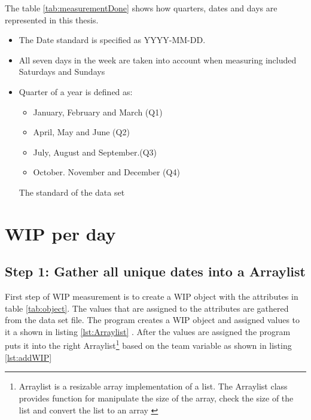 \documentclass[UKenglish]{ifimaster}  %
\begin{document}
The table \ref{tab:measurementDone} shows how quarters, dates and days are represented in this thesis. 

\begin{table}[!ht]
\centering
\begin{itemize}
\item The Date standard is specified as YYYY-MM-DD.
\item All seven days in the week are taken into account when measuring included Saturdays and Sundays
\item Quarter of a year is defined as: 
\begin{itemize}
\item January, February and March (Q1)
\item April, May and June (Q2)
\item July, August and September.(Q3)
\item October. November and December (Q4)
\end{itemize}
\parencite{Quarter}
\caption{The standard of the data set}
\label{tab:measurementDone}
\end{itemize}
\end{table}






\section {WIP per day}
\label{WPD}


\subsection{Step 1: Gather all unique dates into a Arraylist}
\label{sub:stepOne}
First step of WIP measurement is to create a WIP object with the attributes in table \ref{tab:object}.  The values that are assigned to the attributes are gathered from the data set file.  The program creates a WIP object and assigned values to it a shown in listing \ref{lst:Arraylist} . After the values are assigned the program puts it into the right Arraylist\footnote{Arraylist is a resizable array implementation of a list. The Arraylist class provides function for manipulate the size of the array, check the size of the list and convert the list to an array  \parencite{Arraylist}} based on the team variable as shown in listing \ref{lst:addWIP}
\end{document}
